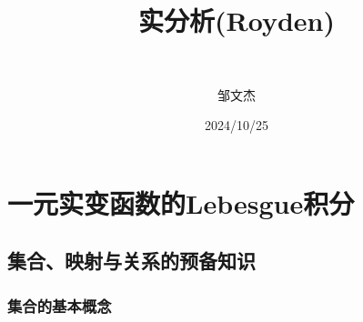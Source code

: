\documentclass[lang=cn,newtx,10pt,scheme=chinese]{../Template/elegantbook}
\title{实分析(Royden)}
\subtitle{\,\,}
\author{邹文杰}
\institute{无}
\date{2024/10/25}
\begin{document}
\maketitle
\frontmatter

\tableofcontents

\mainmatter%


\part{一元实变函数的Lebesgue积分}

\chapter{集合、映射与关系的预备知识}

\section{集合的基本概念}
\end{document}
